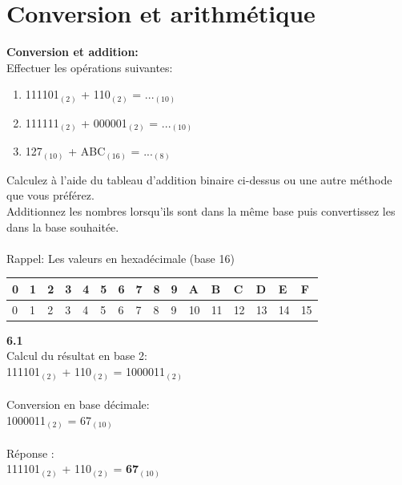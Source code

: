 \section{Conversion et arithmétique}
\begin{Exercice}[20 minutes] \textbf{Conversion et addition:}\\
    Effectuer les opérations suivantes:
    \begin{enumerate}
        \item 111101$_{(2)}$ + 110$_{(2)}$ = ...$_{(10)}$
        \item 111111$_{(2)}$ + 000001$_{(2)}$ = ...$_{(10)}$
        \item 127$_{(10)}$ + ABC$_{(16)}$ = ...$_{(8)}$
    \end{enumerate}
    \begin{conseil}
        Calculez à l'aide du tableau d'addition binaire ci-dessus ou une autre méthode que vous préférez.\\
        Additionnez les nombres lorsqu'ils sont dans la même base puis convertissez les dans la base souhaitée.\\\\
        Rappel: Les valeurs en hexadécimale (base 16)\\
        \begin{tabular}{| C{0.030\textwidth} | C{0.030\textwidth} | C{0.030\textwidth} | C{0.030\textwidth} | C{0.030\textwidth} | C{0.030\textwidth} | C{0.030\textwidth} | C{0.030\textwidth} | C{0.030\textwidth} | C{0.030\textwidth} | C{0.030\textwidth} | C{0.030\textwidth} | C{0.030\textwidth} | C{0.030\textwidth} | C{0.030\textwidth} | C{0.030\textwidth} |} 
            \hline
            \textbf{0} & \textbf{1} & \textbf{2} & \textbf{3} & \textbf{4} & \textbf{5} & \textbf{6} & \textbf{7} & \textbf{8} & \textbf{9} & \textbf{A} & \textbf{B} & \textbf{C} & \textbf{D} & \textbf{E} & \textbf{F}\\ [0.5ex]
             & 1 & 2 & 3 & 4 & 5 & 6 & 7 & 8 & 9 & 10 & 11 & 12 & 13 & 14 & 15 \\ [0.5ex] 
            \hline
        \end{tabular}        
    \end{conseil}
    \begin{solution} \textbf{6.1}\\
        Calcul du résultat en base 2:\\
        111101$_{(2)}$ + 110$_{(2)}$ = 1000011$_{(2)}$\\\\
        Conversion en base décimale:\\
        1000011$_{(2)}$ = 67$_{(10)}$\\\\
        Réponse :\\
        111101$_{(2)}$ + 110$_{(2)}$ = \textbf{67$_{(10)}$}
        

\end{solution}
\end{Exercice}
